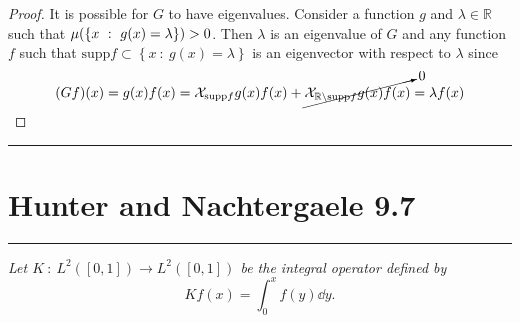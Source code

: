 \documentclass{article} %
\theoremstyle{plain}
\def\Rl{\mathbb{R}}
\newcommand{\problem}[1]{
\vspace{.375cm}
\begin{minipage}{\textwidth}
    \begin{center}
        \noindent\rule{5cm}{1pt}
    \end{center}
    \section{\bf #1}
    \begin{center}
        \noindent\rule{5cm}{1pt}
    \end{center}
    \vspace{0.25cm}
\end{minipage}
}
\numberwithin{equation}{section} %
\numberwithin{figure}{section} %
\numberwithin{table}{section} %
\begin{document}
\begin{proof}
    It is possible for $G$ to have eigenvalues.  Consider a function $g$ and $\lambda \in \Rl$ such that $\mu\qty(\left\{x\ :\ g(x) = \lambda\right\}) > 0$.  Then $\lambda$ is an eigenvalue of $G$ and any function $f$ such that $\text{supp} f \subset \left\{x\ :\ g(x) = \lambda\right\}$ is an eigenvector with respect to $\lambda$ since
    \begin{align*}
        (Gf)(x) = g(x)f(x) = \mathcal{X}_{\text{supp} f}g(x) f(x) + \cancelto{0}{\mathcal{X}_{\Rl\setminus\text{supp}f}g(x) f(x)} = \lambda f(x)
    \end{align*}
\end{proof}









\problem{Hunter and Nachtergaele 9.7}
\emph{Let $K\ :\ L^2([0,1]) \rightarrow L^2([0,1])$ be the integral operator defined by $$Kf(x) = \int_0^x f(y) \dd y.$$}
\end{document}
